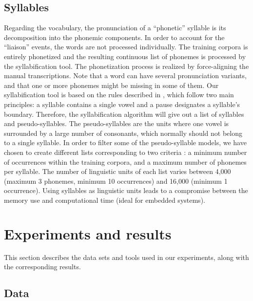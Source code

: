 \documentclass[runningheads,a4paper]{llncs}
\begin{document}
\subsection{Syllables}

Regarding the vocabulary, the pronunciation of a ``phonetic'' syllable is its
decomposition into the phonemic components. In order to account for the ``liaison''
events, the words are not processed individually. The training corpora is
entirely phonetized and the resulting continuous list of phonemes
is processed by the syllabification tool. The phonetization process
is realized by force-aligning the manual transcriptions. Note that
a word can have several pronunciation variants, and that one or more
phonemes might be missing in some of them. Our syllabification tool
is based on the rules described in \cite{TSD15}, which follow two
main principles: a syllable contains a single vowel and a pause designates
a syllable's boundary. Therefore, the syllabification algorithm will
give out a list of syllables and pseudo-syllables. The pseudo-syllables
are the units where one vowel is surrounded by a large number of consonants,
which normally should not belong to a single syllable. In order to
filter some of the pseudo-syllable models, we have chosen to create
different lists corresponding to two criteria : a minimum number of
occurrences within the training corpora, and a maximum number of phonemes
per syllable. The number of linguistic units of each list varies between
4,000 (maximum 3 phonemes, minimum 10 occurrences) and 16,000 (minimum
1 occurrence). Using syllables as linguistic units leads to a compromise
between the memory use and computational time (ideal for embedded systems).


\section{Experiments and results}

This section describes the data sets and tools used in our experiments,
along with the corresponding results.


\subsection{Data}
\end{document}
